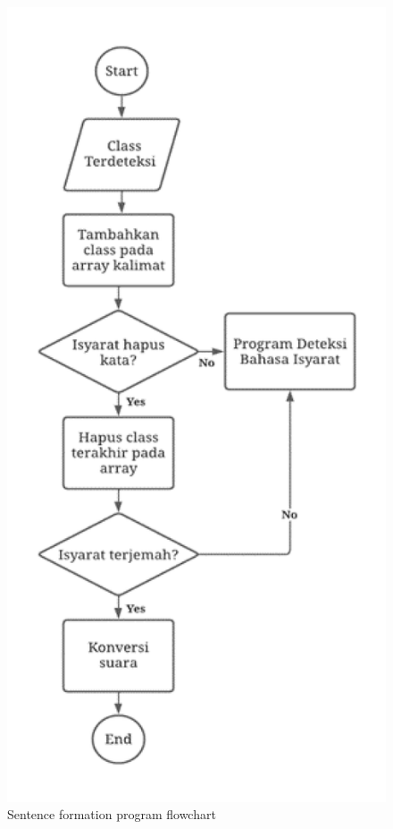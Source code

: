 \begin{figure}[H]
  \centering
  \includegraphics[scale=0.36]{gambar/bab3-flowchart-kalimat.png}
  \caption{Sentence formation program flowchart}
  \label{fig:flowchartkalimat}
\end{figure}

